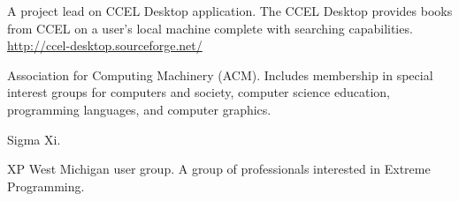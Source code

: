 \documentclass[ComputerScience]{vita}
\newcommand{\duphref}[1]{\href{#1}{#1}}
\begin{document}
\begin{vita}
\begin{software}
  \item A project lead on CCEL Desktop application.  The CCEL Desktop provides books from CCEL on a user's local machine complete with searching capabilities.  \\\duphref{http://ccel-desktop.sourceforge.net/}
\end{software}

\begin{Memberships}

\item Association for Computing Machinery (ACM).  Includes membership in special interest groups for computers and society, computer science education, programming languages, and computer graphics.


\item Sigma Xi.

\item XP West Michigan user group.  A group of professionals interested in Extreme Programming.

\end{Memberships}








\end{vita}
\end{document}
